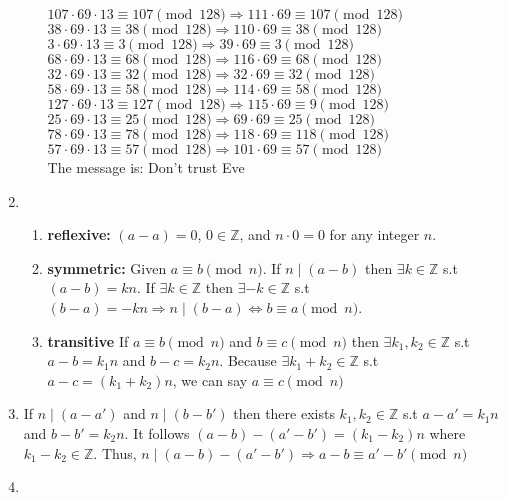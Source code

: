 \documentclass[10pt]{article}
\begin{document}
\begin{enumerate}[label=\arabic*.]
\begin{enumerate}
        $107\cdot69\cdot13\equiv 107\pmod{128}\Rightarrow 111\cdot 69\equiv 107\pmod{128}$\\
        $38\cdot69\cdot13\equiv 38\pmod{128}\Rightarrow 110\cdot 69\equiv 38\pmod{128}$\\
        $3\cdot69\cdot13\equiv 3\pmod{128}\Rightarrow 39\cdot 69\equiv 3\pmod{128}$\\
        $68\cdot69\cdot13\equiv 68\pmod{128}\Rightarrow 116\cdot 69\equiv 68\pmod{128}$\\
        $32\cdot69\cdot13\equiv 32\pmod{128}\Rightarrow 32\cdot 69\equiv 32\pmod{128}$\\
        $58\cdot69\cdot13\equiv 58\pmod{128}\Rightarrow 114\cdot 69\equiv 58\pmod{128}$\\
        $127\cdot69\cdot13\equiv 127\pmod{128}\Rightarrow 115\cdot 69\equiv 9\pmod{128}$\\
        $25\cdot69\cdot13\equiv 25\pmod{128}\Rightarrow 69\cdot 69\equiv 25\pmod{128}$\\
        $78\cdot69\cdot13\equiv 78\pmod{128}\Rightarrow 118\cdot 69\equiv 118\pmod{128}$\\
        $57\cdot69\cdot13\equiv 57\pmod{128}\Rightarrow 101\cdot 69\equiv 57\pmod{128}$\\
        The message is: Don't trust Eve
    \end{enumerate}
    \item \begin{enumerate}
        \item \textbf{reflexive:} $(a-a)=0$, $0\in\mathbb{Z}$, and $n\cdot0=0$ for any integer $n$.
        \item \textbf{symmetric:} Given $a\equiv b\pmod n$. If $n\mid(a-b)$ then $\exists k\in\mathbb{Z}$ s.t $(a-b)=kn$. If $\exists k\in\mathbb{Z}$ then $\exists-k\in\mathbb{Z}$ s.t $(b-a)=-kn\Rightarrow n\mid (b-a)\Leftrightarrow b\equiv a\pmod n$.
        \item \textbf{transitive} If $a\equiv b\pmod{n}$ and $b\equiv c\pmod{n}$ then $\exists k_1,k_2\in\mathbb{Z}$ s.t $a-b=k_1n$ and $b-c=k_2n$. Because $\exists k_1+k_2\in\mathbb{Z}$ s.t $a-c=(k_1+k_2)n$, we can say $a\equiv c\pmod{n}$
    \end{enumerate}
    \item If $n\mid (a-a')$ and $n\mid (b-b')$ then there exists $k_1,k_2\in\mathbb{Z}$ s.t $a-a'=k_1n$ and $b-b'=k_2n$. 
    It follows $(a-b)-(a'-b')=(k_1-k_2)n$ where $k_1-k_2\in\mathbb{Z}$. 
    Thus, $n\mid (a-b)-(a'-b')\Rightarrow a-b\equiv a'-b'\pmod n$
    \item \begin{enumerate}

\end{enumerate}
\end{enumerate}
\end{document}
